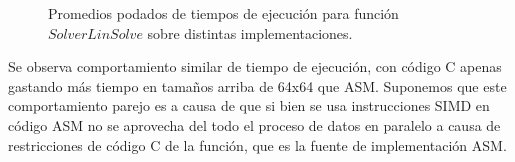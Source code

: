 \begin{figure}[htbp]
\centering


\caption{Promedios podados de tiempos de ejecución para función $Solver Lin Solve$ sobre distintas implementaciones.} \label{fig:lego}
\end{figure}

Se observa comportamiento similar de tiempo de ejecución, con código C apenas gastando más tiempo en tamaños arriba de 64x64 que ASM.
Suponemos que este comportamiento parejo es a causa de que si bien se usa instrucciones SIMD en código ASM no se aprovecha del todo el proceso de datos en paralelo a causa de restricciones de código C de la función, que es la fuente de implementación ASM.


